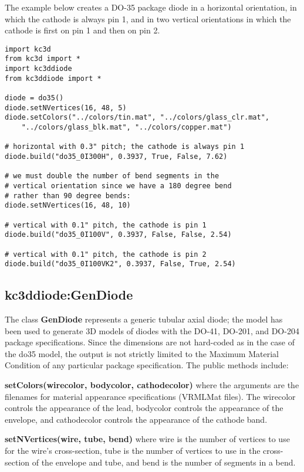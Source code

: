 The example below creates a DO-35 package diode in a horizontal orientation,
in which the cathode is always pin 1, and in two vertical orientations in which
the cathode is first on pin 1 and then on pin 2.

\begin{verbatim}
import kc3d
from kc3d import *
import kc3ddiode
from kc3ddiode import *

diode = do35()
diode.setNVertices(16, 48, 5)
diode.setColors("../colors/tin.mat", "../colors/glass_clr.mat",
    "../colors/glass_blk.mat", "../colors/copper.mat")

# horizontal with 0.3" pitch; the cathode is always pin 1
diode.build("do35_0I300H", 0.3937, True, False, 7.62)

# we must double the number of bend segments in the
# vertical orientation since we have a 180 degree bend
# rather than 90 degree bends:
diode.setNVertices(16, 48, 10)

# vertical with 0.1" pitch, the cathode is pin 1
diode.build("do35_0I100V", 0.3937, False, False, 2.54)

# vertical with 0.1" pitch, the cathode is pin 2
diode.build("do35_0I100VK2", 0.3937, False, True, 2.54)
\end{verbatim}




\subsection{kc3ddiode:GenDiode}
The class \textbf{GenDiode} represents a generic tubular axial diode;
the model has been used to generate 3D models of diodes with the
DO-41, DO-201, and DO-204 package specifications. Since the dimensions
are not hard-coded as in the case of the do35 model, the output is
not strictly limited to the Maximum Material Condition of any particular
package specification. The public methods
include:

\textbf{setColors(wirecolor, bodycolor, cathodecolor)}
where the arguments are the filenames for material appearance specifications
(VRMLMat files). The wirecolor controls the appearance of the lead,
bodycolor controls the appearance of the envelope, and
cathodecolor controls the appearance of the cathode band.

\textbf{setNVertices(wire, tube, bend)} where wire is the number of
vertices to use for the wire's cross-section, tube is the number of
vertices to use in the cross-section of the envelope and tube,
and bend is the number of segments in a bend.

